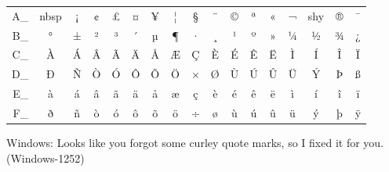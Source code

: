 \documentclass[smaller,xcolor=table,aspectratio=169]{beamer}
\begin{document}
\begin{frame}[plain]
\begin{table}
\begin{tabular}{r|c|c|c|c|c|c|c|c|c|c|c|c|c|c|c|c}
									A\_ & \PUN nbsp              & \PUN ¡                & \PUN ¢                & \PUN £                & \PUN ¤                & \PUN ¥                & \PUN ¦                & \PUN §                & \PUN ¨               & \PUN ©                & \PUN ª               & \PUN «                & \PUN ¬               & \PUN shy & \PUN ®               & \PUN ¯               \\
									B\_ & \PUN °                & \PUN ±                & \ALP ²                & \ALP ³                & \PUN ´                & \ALP µ                & \PUN ¶                & \PUN ·                & \PUN ¸               & \ALP ¹                & \PUN º               & \PUN »                & \ALP ¼               & \ALP ½  & \ALP ¾               & \PUN ¿               \\
									C\_ & \ALP À                & \ALP Á                & \ALP Â                & \ALP Ã                & \ALP Ä                & \ALP Å                & \ALP Æ                & \ALP Ç                & \ALP È               & \ALP É                & \ALP Ê               & \ALP Ë                & \ALP Ì               & \ALP Í  & \ALP Î               & \ALP Ï               \\
									D\_ & \ALP Ð                & \ALP Ñ                & \ALP Ò                & \ALP Ó                & \ALP Ô                & \ALP Õ                & \ALP Ö                & \PUN ×                & \ALP Ø               & \ALP Ù                & \ALP Ú               & \ALP Û                & \ALP Ü               & \ALP Ý  & \ALP Þ               & \ALP ß               \\
									E\_ & \ALP à                & \ALP á                & \ALP â                & \ALP ã                & \ALP ä                & \ALP å                & \ALP æ                & \ALP ç                & \ALP è               & \ALP é                & \ALP ê               & \ALP ë                & \ALP ì               & \ALP í  & \ALP î               & \ALP ï               \\
									F\_ & \ALP ð                & \ALP ñ                & \ALP ò                & \ALP ó                & \ALP ô                & \ALP õ                & \ALP ö                & \PUN ÷                & \ALP ø               & \ALP ù                & \ALP ú               & \ALP û                & \ALP ü               & \ALP ý  & \ALP þ               & \ALP ÿ               \\
								\end{tabular}
							\end{table}
							{\visible<5->Windows:  Looks like you forgot some curley quote marks, so I fixed it for you. (Windows-1252)}
						\end{frame}
\end{document}

